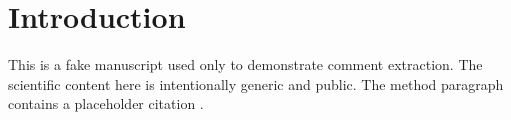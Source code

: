 \documentclass{article}
\begin{document}
\section{Introduction}

This is a fake manuscript used only to demonstrate comment extraction.
The scientific content here is intentionally generic and public.
The method paragraph contains a placeholder citation \cite{example}.
\end{document}
